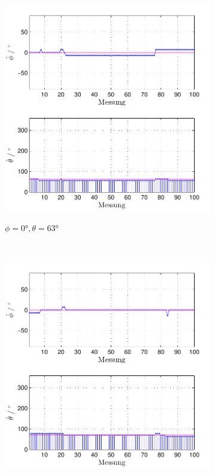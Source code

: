 \begin{figure}
        \begin{subfigure}[b]{0.48\textwidth}
                \centering
                \includegraphics[width=\textwidth]{grafiken/04_Echtzeitversuch/MALE_Phi_0_Theta_63}
                \label{fig:Foto_DSP_Draufsicht}
                \caption{$\phi=0°, \theta = 63°$}
        \end{subfigure}
        ~ %
        \begin{subfigure}[b]{0.48\textwidth}
                \centering
                \includegraphics[width=\textwidth]{grafiken/04_Echtzeitversuch/MALE_Phi_0_Theta_71}

\end{subfigure}
\end{figure}
